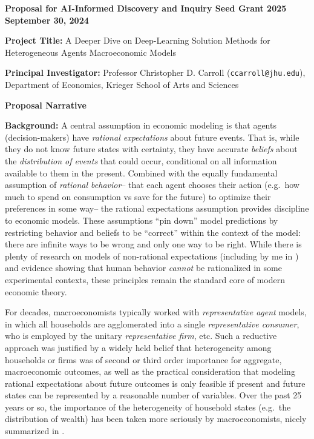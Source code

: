 \documentclass[11pt,pdftex,letterpaper]{article}
\begin{document}
\thispagestyle{empty}

\begin{center}
	\textbf{Proposal for AI-Informed Discovery and Inquiry Seed Grant 2025 \\ September 30, 2024}
\end{center}

\vspace{1.5cm}

\noindent \textbf{Project Title:} A Deeper Dive on Deep-Learning Solution Methods for Heterogeneous Agents Macroeconomic Models

\vspace{1.5cm}

\noindent \textbf{Principal Investigator:} Professor Christopher D. Carroll (\texttt{ccarroll@jhu.edu}), Department of Economics, Krieger School of Arts and Sciences

\newpage
\setcounter{page}{1}

\begin{center}
	\textbf{Proposal Narrative}
\end{center}

\noindent \textbf{Background:} A central assumption in economic modeling is that agents (decision-makers) have \textit{rational expectations} about future events. That is, while they do not know future states with certainty, they have accurate \textit{beliefs} about the \textit{distribution of events} that could occur, conditional on all information available to them in the present. Combined with the equally fundamental assumption of \textit{rational behavior}-- that each agent chooses their action (e.g.\ how much to spend on consumption vs save for the future) to optimize their preferences in some way-- the rational expectations assumption provides discipline to economic models. These assumptions ``pin down'' model predictions by restricting behavior and beliefs to be ``correct'' within the context of the model: there are infinite ways to be wrong and only one way to be right. While there is plenty of research on models of non-rational expectations (including by me in \cite{cAndCwithStickyE}) and evidence showing that human behavior \textit{cannot} be rationalized in some experimental contexts, these principles remain the standard core of modern economic theory.

For decades, macroeconomists typically worked with \textit{representative agent} models, in which all households are agglomerated into a single \textit{representative consumer}, who is employed by the unitary \textit{representative firm}, etc. Such a reductive approach was justified by a widely held belief that heterogeneity among households or firms was of second or third order importance for aggregate, macroeconomic outcomes, as well as the practical consideration that modeling rational expectations about future outcomes is only feasible if present and future states can be represented by a reasonable number of variables. Over the past 25 years or so, the importance of the heterogeneity of household states (e.g.\ the distribution of wealth) has been taken more seriously by macroeconomists, nicely summarized in \cite{FiveGuys}.
\end{document}
